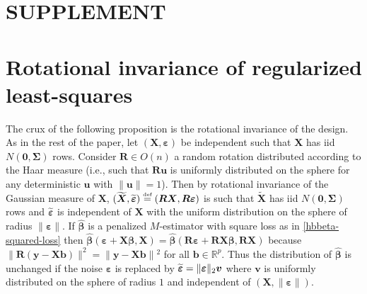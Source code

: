 \documentclass[11pt]{amsart}
\numberwithin{equation}{section}
\numberwithin{equation}{section}
\def\real{{\mathbb{R}}}
\def\R{{\real}}
\def\mathbold{\boldsymbol} %
\def\bb{\mathbold{b}}\def\bhat{\widehat{b}}\def\btil{\widetilde{b}}
\def\bR{\mathbold{R}}\def\hbR{{\widehat{\bR}}}\def\tbR{{\widetilde{\bR}}}
\def\bu{\mathbold{u}}\def\uhat{\widehat{u}}\def\util{\widetilde{u}}\def\ubar{{\overline u}}
\def\bv{\mathbold{v}}\def\vhat{\widehat{v}}\def\vtil{\widetilde{v}}\def\vbar{{\overline v}}
\def\bX{\mathbold{X}}\def\hbX{{\widehat{\bX}}}\def\tbX{{\widetilde{\bX}}}\def\bXbar{{\overline \bX}}
\def\by{\mathbold{y}}\def\yhat{\widehat{y}}\def\ytil{\widetilde{y}}\def\ybar{{\overline y}}\def\vby{{\bf y}}
\def\bbeta{\mathbold{\beta}}\def\betahat{\widehat{\beta}}\def\hbeta{\widehat{\beta}}
\def\hbbeta{{{\widehat{\bbeta}}}}
\def\ep{\varepsilon}\def\eps{\epsilon}\def\veps{\varepsilon}
\def\bep{ {\mathbold{\ep} }}
\def\bSigma{\mathbold{\Sigma}}\def\hbSigma{{\widehat{\bSigma}}}
\def\defas{\stackrel{\text{\tiny def}}{=}}
\newcommand\pb[1]{{ #1 }}
\begin{document}
%





\newpage
\section*{SUPPLEMENT}











\section{Rotational invariance of
regularized least-squares}

The crux of the following proposition is the rotational
invariance of the design. As in the rest of the paper,
let $(\bX,\bep)$ be independent such that
$\bX$ has iid $N(\mathbf{0},\bSigma)$ rows.
Consider $\bR\in O(n)$ a random rotation
distributed according to the Haar measure
(i.e., such that $\bR\bu$ is uniformly distributed on the sphere
for any deterministic $\bu$ with $\|\bu\|=1$).
Then by rotational invariance of the Gaussian measure of $\bX$,
$(\tbX,\tbep) \defas (\bR\bX,\bR\bep)$ is such that
$\tbX$ has iid $N(\mathbf{0},\bSigma)$ rows
and $\tbep$ is independent of $\bX$ with the uniform distribution
on the sphere of radius $\|\bep\|$.
If $\hbbeta$
is a penalized $M$-estimator with square loss
as in \eqref{hbbeta-squared-loss} then 
$\hbbeta(\bep + \bX\bbeta,\bX)
=\hbbeta(\bR\bep + \bR\bX\bbeta, \bR\bX)$
because $\|\bR(\by-\bX\bb)\|^2 = \|\by-\bX\bb\|\pb{^2}$ for all $\bb\in\R^p$.
Thus the distribution of $\hbbeta$ is unchanged if the noise $\bep$
is replaced by $\tbep = \|\bep\|_2 \bv$ where $\bv$ is uniformly
distributed on the sphere of radius $1$ and
independent of $(\bX,\|\bep\|)$.
\end{document}
